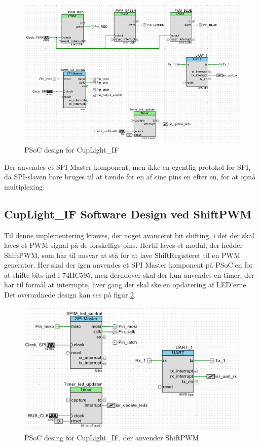 \documentclass[Softwaredesign/Softwaredesign_main.tex]{subfiles}
\begin{document}
\begin{figure}[H]
    \centering
    \includegraphics[width=\textwidth]{Softwaredesign/CupLight_IF/graphics/CupLightPSoCDesign.png}
    \caption{PSoC design for CupLight\_IF}
    \label{fig:CupLight_PSoC_Design}
\end{figure}

Der anvendes et SPI Master komponent, men ikke en egentlig protokol for SPI, da SPI-slaven bare bruges til at tænde for en af sine pins en efter en, for at opnå multiplexing.

\subsection{CupLight\_IF Software Design ved ShiftPWM}
Til denne implementering kræves, der noget avanceret bit shifting, i det der skal laves et PWM signal på de forskellige pins. Hertil laves et modul, der hedder ShiftPWM, som har til ansvar at stå for at lave ShiftRegisteret til en PWM generator. Her skal der igen anvendes et SPI Master komponent på PSoC'en for at shifte bits ind i 74HC595, men derudover skal der kun anvendes en timer, der har til formål at interrupte, hver gang der skal ske en opdatering af LED'erne. Det overordnede design kan ses på figur \ref{fig:CupLight_ShiftPWM_PSoC_Design}.

\begin{figure}
    \centering
    \includegraphics{Softwaredesign/CupLight_IF/graphics/CupLightPSoCDesign_ShiftPWM.png}
    \caption{PSoC desing for CupLight\_IF, der anvender ShiftPWM}
    \label{fig:CupLight_ShiftPWM_PSoC_Design}
\end{figure}
\end{document}
